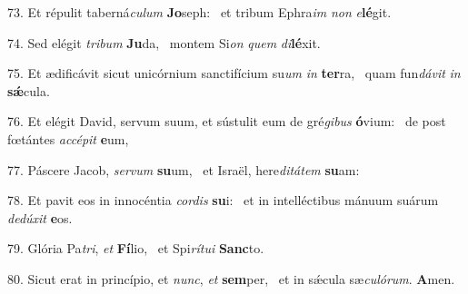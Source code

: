 73. Et répulit taberná\textit{cu}\textit{lum} \textbf{Jo}seph: \ast\  et tribum Ephra\textit{im} \textit{non} \textit{e}\textbf{lé}git.\

74. Sed elégit \textit{tri}\textit{bum} \textbf{Ju}da, \ast\  montem Si\textit{on} \textit{quem} \textit{di}\textbf{lé}xit.\

75. Et ædificávit sicut unicórnium sanctifícium su\textit{um} \textit{in} \textbf{ter}ra, \ast\  quam fun\textit{dá}\textit{vit} \textit{in} \textbf{sǽ}cula.\

76. Et elégit David, servum suum, et sústulit eum de gré\textit{gi}\textit{bus} \textbf{ó}vium: \ast\  de post fœtántes \textit{ac}\textit{cé}\textit{pit} \textbf{e}um,\

77. Páscere Jacob, \textit{ser}\textit{vum} \textbf{su}um, \ast\  et Israël, here\textit{di}\textit{tá}\textit{tem} \textbf{su}am:\

78. Et pavit eos in innocéntia \textit{cor}\textit{dis} \textbf{su}i: \ast\  et in intelléctibus mánuum suárum \textit{de}\textit{dú}\textit{xit} \textbf{e}os.\

79. Glória Pa\textit{tri}, \textit{et} \textbf{Fí}lio, \ast\  et Spi\textit{rí}\textit{tu}\textit{i} \textbf{Sanc}to.\

80. Sicut erat in princípio, et \textit{nunc}, \textit{et} \textbf{sem}per, \ast\  et in sǽcula sæ\textit{cu}\textit{ló}\textit{rum}. \textbf{A}men.\

